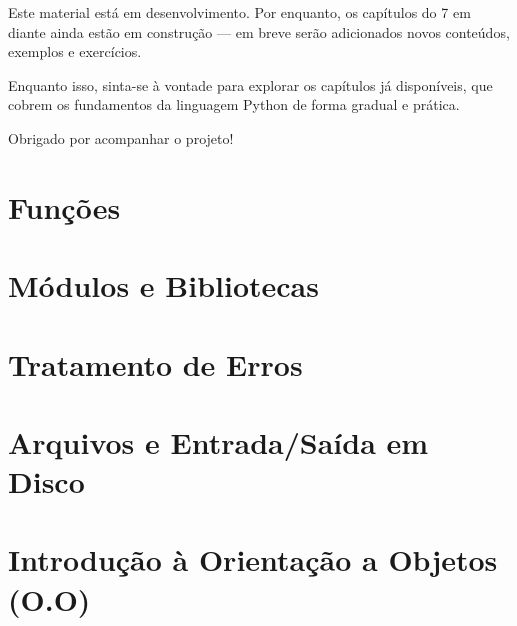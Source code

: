 \documentclass[12pt]{book}
\begin{document}
	\begin{tcolorbox}[colback=yellow!10, colframe=black, title={\large\bfseries Nota ao leitor}]
		Este material está em desenvolvimento. Por enquanto, os capítulos do 7 em diante ainda estão em construção — em breve serão adicionados novos conteúdos, exemplos e exercícios.
		
		Enquanto isso, sinta-se à vontade para explorar os capítulos já disponíveis, que cobrem os fundamentos da linguagem Python de forma gradual e prática.
		
		Obrigado por acompanhar o projeto!
	\end{tcolorbox}
	
	
	\chapter{Funções}
	
	\chapter{Módulos e Bibliotecas}
	
	\chapter{Tratamento de Erros}
	
	\chapter{Arquivos e Entrada/Saída em Disco}
	
	\chapter{Introdução à Orientação a Objetos (O.O)}
	
\end{document}
